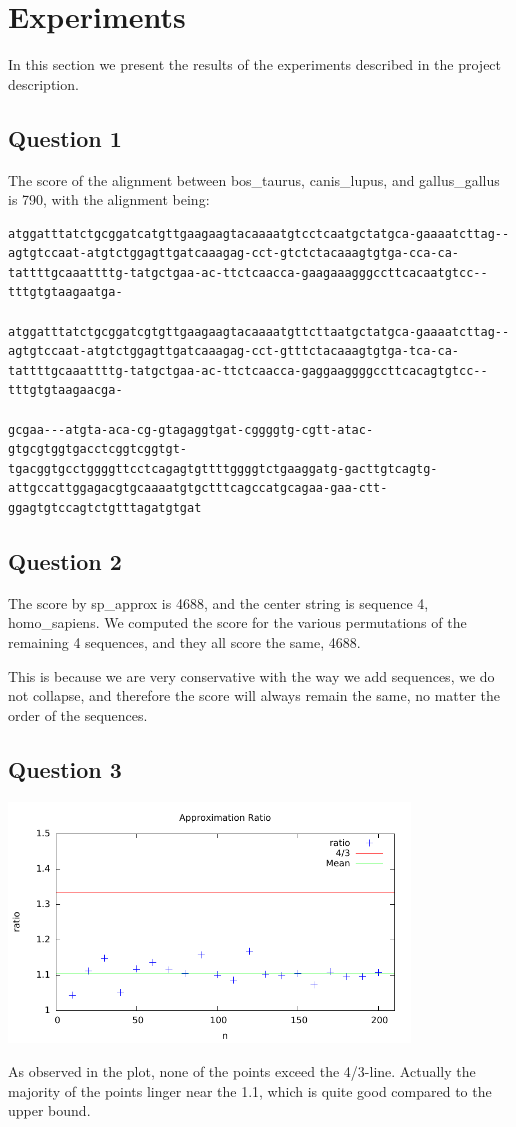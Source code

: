 \section{Experiments}

In this section we present the results of the experiments described in the project description.

\subsection{Question 1}
The score of the alignment between bos\_taurus, canis\_lupus, and gallus\_gallus is 790, with the alignment being: 

\begin{verbatim}
atggatttatctgcggatcatgttgaagaagtacaaaatgtcctcaatgctatgca-gaaaatcttag--agtgtccaat-atgtctggagttgatcaaagag-cct-gtctctacaaagtgtga-cca-ca-tattttgcaaattttg-tatgctgaa-ac-ttctcaacca-gaagaaagggccttcacaatgtcc--tttgtgtaagaatga-

atggatttatctgcggatcgtgttgaagaagtacaaaatgttcttaatgctatgca-gaaaatcttag--agtgtccaat-atgtctggagttgatcaaagag-cct-gtttctacaaagtgtga-tca-ca-tattttgcaaattttg-tatgctgaa-ac-ttctcaacca-gaggaaggggccttcacagtgtcc--tttgtgtaagaacga-

gcgaa---atgta-aca-cg-gtagaggtgat-cggggtg-cgtt-atac-gtgcgtggtgacctcggtcggtgt-tgacggtgcctggggttcctcagagtgttttggggtctgaaggatg-gacttgtcagtg-attgccattggagacgtgcaaaatgtgctttcagccatgcagaa-gaa-ctt-ggagtgtccagtctgtttagatgtgat
\end{verbatim}

\subsection{Question 2}
The score by sp\_approx is 4688, and the center string is sequence 4, homo\_sapiens.
We computed the score for the various permutations of the remaining 4 sequences, and they all score the same, 4688. 

This is because we are very conservative with the way we add sequences, we do not collapse, and therefore the score will always remain the same, no matter the order of the sequences. 

\subsection{Question 3}
\begin{center}
    \includegraphics[width=0.8\textwidth]{plot1.pdf}
\end{center}
As observed in the plot, none of the points exceed the 4/3-line. Actually the majority of the points linger near the 1.1, which is quite good compared to the upper bound. 
